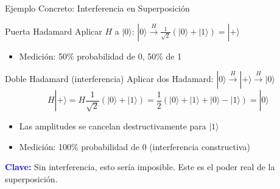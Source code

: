 \documentclass[aspectratio=169]{beamer}
\begin{document}
\begin{frame}{Ejemplo Concreto: Interferencia en Superposición}
\small
\begin{exampleblock}{Puerta Hadamard}
Aplicar $H$ a $|0\rangle$: $|0\rangle \xrightarrow{H} \frac{1}{\sqrt{2}}(|0\rangle + |1\rangle) = |+\rangle$
\begin{itemize}
\item Medición: 50\% probabilidad de 0, 50\% de 1
\end{itemize}
\end{exampleblock}

\vspace{0.15cm}
\begin{exampleblock}{Doble Hadamard (interferencia)}
Aplicar dos Hadamard: $|0\rangle \xrightarrow{H} |+\rangle \xrightarrow{H} |0\rangle$
\begin{equation*}
H|+\rangle = H\frac{1}{\sqrt{2}}(|0\rangle + |1\rangle) = \frac{1}{2}(|0\rangle+|1\rangle+|0\rangle-|1\rangle) = |0\rangle
\end{equation*}
\begin{itemize}
\item Las amplitudes se cancelan destructivamente para $|1\rangle$
\item Medición: 100\% probabilidad de 0 (interferencia constructiva)
\end{itemize}
\end{exampleblock}

\textcolor{blue}{\textbf{Clave:}} Sin interferencia, esto sería imposible. Este es el poder real de la superposición.
\end{frame}
\end{document}
